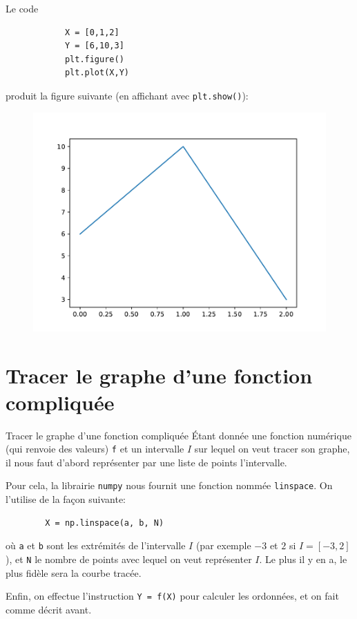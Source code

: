 \begin{frame}[fragile]
	\begin{exem}
	Le code
		\begin{lstlisting}
			X = [0,1,2]
			Y = [6,10,3]
			plt.figure()
			plt.plot(X,Y)
		\end{lstlisting}
	produit la figure suivante (en affichant avec \lstinline|plt.show()|):
	\begin{figure}
		\includegraphics[height=0.5\textheight]{exemple_matplotlib_1.pdf}
	\end{figure}
	\end{exem}
\end{frame}

\section{Tracer le graphe d'une fonction compliquée}

\begin{frame}[fragile]{Tracer le graphe d'une fonction compliquée}
	Étant donnée une fonction numérique (qui renvoie des valeurs) \lstinline|f| et un intervalle $I$ sur lequel on veut tracer son graphe, il nous faut d'abord représenter par une liste de points l'intervalle.\pause
	
	Pour cela, la librairie \lstinline|numpy| nous fournit une fonction nommée \lstinline|linspace|. On l'utilise de la façon suivante:
	\begin{lstlisting}
		X = np.linspace(a, b, N)
	\end{lstlisting}
	où \lstinline|a| et \lstinline|b| sont les extrémités de l'intervalle $I$ (par exemple $-3$ et $2$ si $I=[-3,2]$), et \lstinline|N| le nombre de points avec lequel on veut représenter $I$. Le plus il y en a, le plus fidèle sera la courbe tracée.\pause
	
	Enfin, on effectue l'instruction \lstinline|Y = f(X)| pour calculer les ordonnées, et on fait comme décrit avant.
\end{frame}

